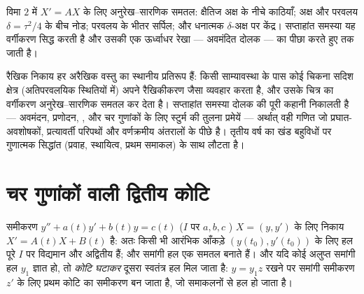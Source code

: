 \begin{omfigure}

{\small विमा $2$ में $X' = AX$ के लिए अनुरेख--सारणिक समतल: क्षैतिज अक्ष के
नीचे काठियाँ; अक्ष और परवलय $\delta = \tau^2/4$ के बीच नोड; परवलय के भीतर सर्पिल; और
धनात्मक $\delta$-अक्ष पर केंद्र। सप्ताहांत समस्या यह वर्गीकरण सिद्ध करती है
और उसकी एक ऊर्ध्वाधर रेखा --- अवमंदित दोलक --- का पीछा करते हुए  तक
जाती है।}
\end{omfigure}

\begin{remark}[यह कहाँ काम आता है]
रैखिक निकाय हर अरैखिक वस्तु का स्थानीय प्रतिरूप हैं: किसी साम्यावस्था के
पास कोई चिकना सदिश क्षेत्र (अतिपरवलयिक स्थितियों में) अपने रैखिकीकरण जैसा
व्यवहार करता है, और उसके चित्र का वर्गीकरण अनुरेख--सारणिक समतल कर देता है।
सप्ताहांत समस्या दोलक की पूरी कहानी निकालती है --- अवमंदन, प्रणोदन,
, और चर गुणांकों के लिए स्टुर्म की तुलना प्रमेयें --- अर्थात् वही
गणित जो प्रघात-अवशोषकों, प्रत्यावर्ती परिपथों और वर्णक्रमीय अंतरालों के
पीछे है। तृतीय वर्ष का खंड बहुविधों पर गुणात्मक सिद्धांत (प्रवाह,
स्थायित्व, प्रथम समाकल) के साथ लौटता है।
\end{remark}

\section{चर गुणांकों वाली द्वितीय कोटि}

\begin{proposition}\label{prop:b2:diffeq:secondorder}
समीकरण $y'' + a(t)y' + b(t)y = c(t)$ ($I$ पर $a, b, c$ ) $X = (y, y')$ के लिए निकाय $X' = A(t)X + B(t)$ है: अतः किसी भी आरंभिक
आँकड़े $(y(t_0),
y'(t_0))$ के लिए हल पूरे $I$ पर विद्यमान और अद्वितीय हैं; और समांगी हल
एक समतल बनाते हैं। और यदि कोई अलुप्त समांगी हल $y_1$ ज्ञात हो, तो
\emph{कोटि घटाकर} दूसरा स्वतंत्र हल मिल जाता है: $y = y_1 z$ रखने पर समांगी समीकरण
$z'$ के लिए प्रथम कोटि का समीकरण बन जाता है, जो समाकलनों से हल हो जाता है।
\end{proposition}

